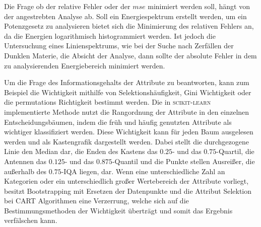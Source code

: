 Die Frage ob der relative Fehler oder der $mse$ minimiert werden soll, hängt von der angestrebten Analyse ab.
Soll ein Energiespektrum erstellt werden, um ein Potenzgesetz zu analysieren bietet sich die Minimierung des relativen Fehlers an, da die
Energien logarithmisch histogrammiert werden.
Ist jedoch die Untersuchung eines Linienspektrums, wie bei der Suche nach Zerfällen der Dunklen Materie, die Absicht der Analyse, dann sollte
der absolute Fehler in dem zu analysierenden Energiebereich minimiert werden.


Um die Frage des Informationsgehalts der Attribute zu beantworten, kann zum Beispiel die Wichtigkeit mithilfe von Selektionshäufigkeit, Gini Wichtigkeit oder
die permutations Richtigkeit bestimmt werden.
Die in \textsc{scikit-learn} implementierte Methode nutzt die Rangordnung der Attribute in den einzelnen Entscheidungsbäumen, indem die früh und häufig genutzten Attribute
als wichtiger klassifiziert werden.
Diese Wichtigkeit kann für jeden Baum ausgelesen werden und als Kastengrafik dargestellt werden.
Dabei stellt die durchgezogene Linie den Median dar, die Enden des Kastens das $\num{0.25}$- und das $\num{0.75}$-Quartil, die Antennen das $\num{0.125}$- und das
$\num{0.875}$-Quantil und die Punkte stellen Ausreißer, die außerhalb des $\num{0.75}$-IQA liegen, dar.
Wenn eine unterschiedliche Zahl an Kategorien oder ein unterschiedlich großer Wertebereich der Attribute vorliegt, besitzt Bootstrapping mit Ersetzen der Datenpunkte
und die Attribut Selektion bei CART Algorithmen eine Verzerrung, welche sich auf die Bestimmungsmethoden der Wichtigkeit überträgt und somit das Ergebnis verfälschen
kann\cite{feature_importance}.
